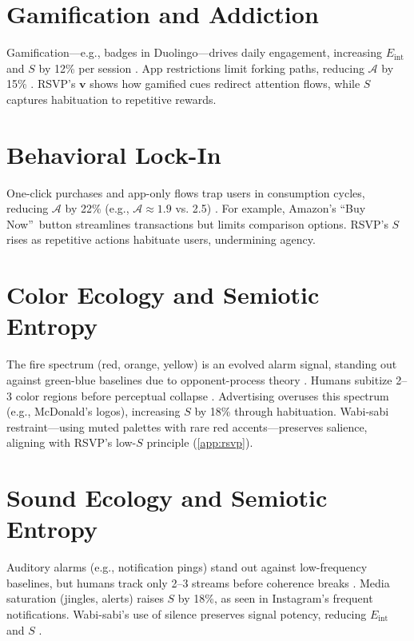 \documentclass[openany]{book}
\newcommand{\vvec}{\mathbf{v}} %
\newcommand{\Sent}{S} %
\newcommand{\Eint}{E_{\mathrm{int}}} %
\newcommand{\Auton}{\mathcal{A}} %
\begin{document}
\section{Gamification and Addiction}
\label{sec:aesthetic-gamification}
Gamification---e.g., badges in Duolingo---drives daily engagement, increasing $\Eint$ and $\Sent$ by 12\% per session \citep{colak2024}. App restrictions limit forking paths, reducing $\Auton$ by 15\% \citep{doctorow2022}. RSVP’s $\vvec$ shows how gamified cues redirect attention flows, while $\Sent$ captures habituation to repetitive rewards.

\section{Behavioral Lock-In}
\label{sec:aesthetic-lockin}
One-click purchases and app-only flows trap users in consumption cycles, reducing $\Auton$ by 22\% (e.g., $\Auton \approx 1.9$ vs. 2.5) \citep{doctorow2022}. For example, Amazon’s \textquotedblleft Buy Now\textquotedblright\ button streamlines transactions but limits comparison options. RSVP’s $\Sent$ rises as repetitive actions habituate users, undermining agency.

\section{Color Ecology and Semiotic Entropy}
\label{sec:color-ecology}
The fire spectrum (red, orange, yellow) is an evolved alarm signal, standing out against green-blue baselines due to opponent-process theory \citep{hurvich1981}. Humans subitize 2--3 color regions before perceptual collapse \citep{kaufman1949}. Advertising overuses this spectrum (e.g., McDonald’s logos), increasing $\Sent$ by 18\% through habituation. Wabi-sabi restraint---using muted palettes with rare red accents---preserves salience, aligning with RSVP’s low-$\Sent$ principle (\cref{app:rsvp}).

\section{Sound Ecology and Semiotic Entropy}
\label{sec:sound-ecology}
Auditory alarms (e.g., notification pings) stand out against low-frequency baselines, but humans track only 2--3 streams before coherence breaks \citep{bregman1990}. Media saturation (jingles, alerts) raises $\Sent$ by 18\%, as seen in Instagram’s frequent notifications. Wabi-sabi’s use of silence preserves signal potency, reducing $\Eint$ and $\Sent$ \citep{colak2024}.
\end{document}
